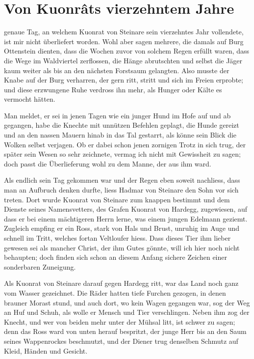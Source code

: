 
\section{Von Kuonr\^{a}ts vierzehntem Jahre}

 genaue Tag, an welchem \gls{Kuonrat von Steinare} sein vierzehntes Jahr vollendete, ist mir nicht überliefert worden. Wohl aber sagen mehrere, die damals auf Burg Ottenstein dienten, dass die Wochen zuvor von solchem Regen erfüllt waren, dass die Wege im \gls{Waldviertel} zerflossen, die Hänge abrutschten und selbst die Jäger kaum weiter als bis an den nächsten Forstsaum gelangten. Also musste der Knabe auf der Burg verharren, der gern ritt, stritt und sich im Freien erprobte; und diese erzwungene Ruhe verdross ihn mehr, als Hunger oder Kälte es vermocht hätten.

Man meldet, er sei in jenen Tagen wie ein junger Hund im Hofe auf und ab gegangen, habe die Knechte mit unnützen Befehlen geplagt, die Hunde gereizt und an den nassen Mauern hinab in das Tal gestarrt, als könne sein Blick die Wolken selbst verjagen. Ob er dabei schon jenen zornigen Trotz in sich trug, der später sein Wesen so sehr zeichnete, vermag ich nicht mit Gewissheit zu sagen; doch passt die Überlieferung wohl zu dem Manne, der aus ihm ward.

Als endlich sein Tag gekommen war und der Regen eben soweit nachliess, dass man an Aufbruch denken durfte, liess \gls{Hadmar von Steinare} den Sohn vor sich treten. Dort wurde \gls{Kuonrat von Steinare} zum \gls{knappe}n bestimmt und dem Dienste seines Namensvetters, des Grafen \gls{Kuonrat von Hardegg}, zugewiesen, auf dass er bei einem mächtigeren Herrn lerne, was einem jungen Edelmann geziemt. Zugleich empfing er ein Ross, stark von Hals und Brust, unruhig im Auge und schnell im Tritt, welches fortan \gls{Veltloufer} hiess. Dass dieses Tier ihm lieber gewesen sei als mancher Christ, der ihm Gutes gönnte, will ich hier noch nicht behaupten; doch finden sich schon an diesem Anfang sichere Zeichen einer sonderbaren Zuneigung.

Als \gls{Kuonrat von Steinare} darauf gegen \gls{Hardegg} ritt, war das Land noch ganz vom Wasser gezeichnet. Die Räder hatten tiefe Furchen gezogen, in denen brauner Morast stund, und auch dort, wo kein Wagen gegangen war, sog der Weg an Huf und Schuh, als wolle er Mensch und Tier verschlingen. Neben ihm zog der \gls{Knecht}, und wer von beiden mehr unter der Mühsal litt, ist schwer zu sagen; denn das Ross ward von unten herauf bespritzt, der junge Herr bis an den Saum seines Wappenrockes beschmutzt, und der Diener trug denselben Schmutz auf Kleid, Händen und Gesicht.

